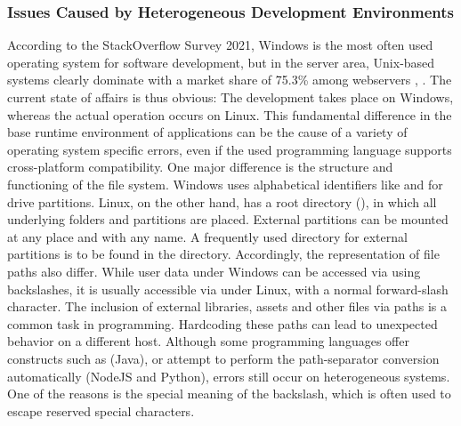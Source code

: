         \subsubsection{Issues Caused by Heterogeneous Development Environments}\label{sss::hetero}
        According to the StackOverflow Survey 2021, Windows is the most often used operating system for software development, but in the server area, Unix-based systems clearly dominate with a market share of 75.3\% among webservers \cite{stackoverflow2021}, \cite{unixusage}. The current state of affairs is thus obvious: The development takes place on Windows, whereas the actual operation occurs on Linux. This fundamental difference in the base runtime environment of applications can be the cause of a variety of operating system specific errors, even if the used programming language supports cross-platform compatibility. One major difference is the structure and functioning of the file system. Windows uses alphabetical identifiers like  and  for drive partitions. Linux, on the other hand, has a root directory (\code{/}), in which all underlying folders and partitions are placed. External partitions can be mounted at any place and with any name. A frequently used directory for external partitions is to be found in the  directory. Accordingly, the representation of file paths also differ. While user data under Windows can be accessed via  using backslashes, it is usually accessible via  under Linux, with a normal forward-slash character. The inclusion of external libraries, assets and other files via paths is a common task in programming. Hardcoding these paths can lead to unexpected behavior on a different host. Although some programming languages offer constructs such as  (Java), or attempt to perform the path-separator conversion automatically (NodeJS and Python), errors still occur on heterogeneous systems. One of the reasons is the special meaning of the backslash, which is often used to escape reserved special characters.\newline
